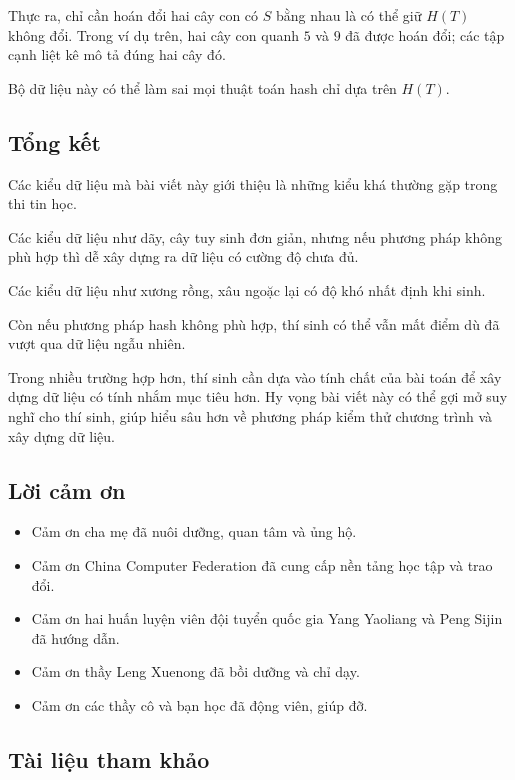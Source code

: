 \documentclass[11pt]{article}
\begin{document}
Thực ra, chỉ cần hoán đổi hai cây con có $S$ bằng nhau là có thể giữ $H(T)$
không đổi. Trong ví dụ trên, hai cây con quanh $5$ và $9$ đã được hoán đổi;
các tập cạnh liệt kê mô tả đúng hai cây đó.

Bộ dữ liệu này có thể làm sai mọi thuật toán hash chỉ dựa trên $H(T)$.

\subsection{Tổng kết}

Các kiểu dữ liệu mà bài viết này giới thiệu là những kiểu khá thường gặp trong
thi tin học.

Các kiểu dữ liệu như dãy, cây tuy sinh đơn giản, nhưng nếu phương pháp không
phù hợp thì dễ xây dựng ra dữ liệu có cường độ chưa đủ.

Các kiểu dữ liệu như xương rồng, xâu ngoặc lại có độ khó nhất định khi sinh.

Còn nếu phương pháp hash không phù hợp, thí sinh có thể vẫn mất điểm dù đã vượt
qua dữ liệu ngẫu nhiên.

Trong nhiều trường hợp hơn, thí sinh cần dựa vào tính chất của bài toán để xây
dựng dữ liệu có tính nhắm mục tiêu hơn. Hy vọng bài viết này có thể gợi mở suy
nghĩ cho thí sinh, giúp hiểu sâu hơn về phương pháp kiểm thử chương trình và
xây dựng dữ liệu.

\subsection{Lời cảm ơn}

\begin{itemize}
  \item Cảm ơn cha mẹ đã nuôi dưỡng, quan tâm và ủng hộ.
  \item Cảm ơn China Computer Federation đã cung cấp nền tảng học tập và trao
  đổi.
  \item Cảm ơn hai huấn luyện viên đội tuyển quốc gia Yang Yaoliang và Peng
  Sijin đã hướng dẫn.
  \item Cảm ơn thầy Leng Xuenong đã bồi dưỡng và chỉ dạy.
  \item Cảm ơn các thầy cô và bạn học đã động viên, giúp đỡ.
\end{itemize}

\subsection{Tài liệu tham khảo}
\end{document}
